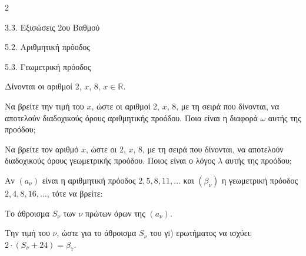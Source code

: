 \begin{ylh}{2}
    \item 3.3. Εξισώσεις 2ου Βαθμού
    \item 5.2. Αριθμητική πρόοδος
    \item 5.3. Γεωμετρική πρόοδος
\end{ylh}
Δίνονται οι αριθμοί 2, $x$, 8, $x \in \mathbb{R}$.

\begin{alist}
\item Να βρείτε την τιμή του $x$, ώστε οι αριθμοί 2, $x$, 8, με τη σειρά που δίνονται, να αποτελούν διαδοχικούς όρους αριθμητικής προόδου. Ποια είναι η διαφορά $\omega$ αυτής της προόδου; 
\item Να βρείτε τον αριθμό $x$, ώστε οι 2, $x$, 8, με τη σειρά που δίνονται, να αποτελούν διαδοχικούς όρους γεωμετρικής προόδου. Ποιος είναι ο λόγος $\lambda$ αυτής της προόδου; 
\item Αν $(a_\nu)$ είναι η αριθμητική πρόοδος $2, 5, 8, 11, \dots$ και $(\beta_\nu)$ η γεωμετρική πρόοδος $2, 4, 8, 16, \dots$, τότε να βρείτε:

\begin{rlist}
\item Το άθροισμα $S_\nu$ των $\nu$ πρώτων όρων της $(a_\nu)$. 
\item Την τιμή του $\nu$, ώστε για το άθροισμα $S_\nu$ του γi) ερωτήματος να ισχύει: $2 \cdot (S_\nu + 24) = \beta_7$. 
\end{rlist}
\end{alist}

